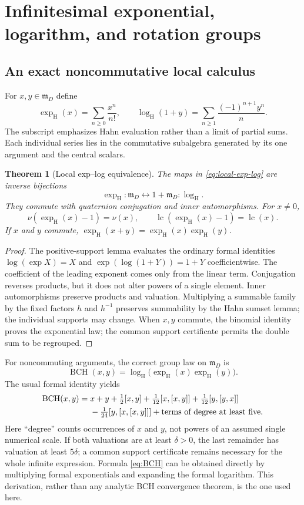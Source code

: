 \documentclass[11pt,letterpaper]{article}
\newtheorem{theorem}{Theorem}[section]
\theoremstyle{definition}
\newcommand{\mm}{\mathfrak m}
\newcommand{\val}{\nu}
\DeclareMathOperator{\BCH}{BCH}
\newcommand{\exph}{\operatorname{exp}_{\mathrm H}}
\newcommand{\logh}{\operatorname{log}_{\mathrm H}}
\begin{document}
\section{Infinitesimal exponential, logarithm, and rotation groups}
\label{sec:lie}
\subsection{An exact noncommutative local calculus}
For $x,y\in\mm_D$ define
\begin{equation}
 \exph(x)=\sum_{n\ge0}\frac{x^n}{n!},\qquad
 \logh(1+y)=\sum_{n\ge1}\frac{(-1)^{n+1}y^n}{n}.
 \label{eq:local-exp-log}
\end{equation}
The subscript emphasizes Hahn evaluation rather than a limit of partial sums.
Each individual series lies in the commutative subalgebra generated by its one
argument and the central scalars.

\begin{theorem}[Local exp--log equivalence]
\label{thm:local-exp}
The maps in \eqref{eq:local-exp-log} are inverse bijections
\[
 \exph:\mm_D\longleftrightarrow1+\mm_D:\logh.
\]
They commute with quaternion conjugation and inner automorphisms. For $x\ne0$,
\[
 \val(\exph(x)-1)=\val(x),\qquad
 \operatorname{lc}(\exph(x)-1)=\operatorname{lc}(x).
\]
If $x$ and $y$ commute, $\exph(x+y)=\exph(x)\exph(y)$.
\end{theorem}
\begin{proof}
The positive-support lemma evaluates the ordinary formal identities
$\log(\exp X)=X$ and $\exp(\log(1+Y))=1+Y$ coefficientwise. The coefficient of
the leading exponent comes only from the linear term. Conjugation reverses
products, but it does not alter powers of a single element. Inner automorphisms
preserve products and valuation. Multiplying a summable family by the fixed
factors $h$ and $h^{-1}$ preserves summability by the Hahn sumset lemma; the
individual supports may change. When $x,y$ commute, the binomial identity
proves the exponential law; the common support certificate permits the double
sum to be regrouped.
\end{proof}
For noncommuting arguments, the correct group law on $\mm_D$ is
\[
 \BCH(x,y)=\logh\bigl(\exph(x)\exph(y)\bigr).
\]
The usual formal identity yields
\begin{align}
 \BCH(x,y)={}&x+y+\tfrac12[x,y]
 +\tfrac1{12}[x,[x,y]]+\tfrac1{12}[y,[y,x]]\notag\\
 &-\tfrac1{24}[y,[x,[x,y]]]+\text{terms of degree at least five}.
 \label{eq:BCH}
\end{align}
Here ``degree'' counts occurrences of $x$ and $y$, not powers of an assumed
single numerical scale. If both valuations are at least $\delta>0$, the last
remainder has valuation at least $5\delta$; a common support certificate remains
necessary for the whole infinite expression. Formula \eqref{eq:BCH} can be
obtained directly by multiplying formal exponentials and expanding the formal
logarithm. This derivation, rather than any analytic BCH convergence theorem,
is the one used here.
\end{document}
